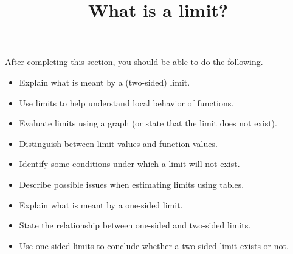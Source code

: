 \documentclass{ximera}
\title{What is a limit?}
\begin{document}
\begin{abstract}
\end{abstract}

\maketitle

\begin{sectionOutcomes}
After completing this section, you should be able to do the following.

\begin{itemize}
	\item Explain what is meant by a (two-sided) limit.
    \item Use limits to help understand local behavior of functions.
	\item Evaluate limits using a graph (or state that the limit does not exist).
    	\item Distinguish between limit values and function values.
	\item Identify some conditions under which a limit will not exist.
	\item Describe possible issues when estimating limits using tables.
	\item Explain what is meant by a one-sided limit.
	\item State the relationship between one-sided and two-sided limits.
    \item Use one-sided limits to conclude whether a two-sided limit exists or not. 
\end{itemize}
\end{sectionOutcomes}
\end{document}
